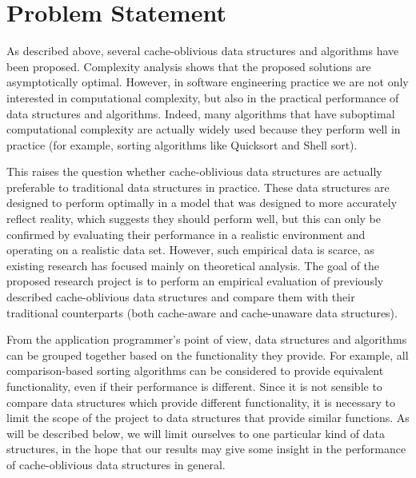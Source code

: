 \documentclass{acm_proc_article-sp}
\begin{document}
\section{Problem Statement}
As described above, several cache-oblivious data structures and algorithms have been proposed. Complexity analysis shows that the proposed solutions are asymptotically optimal. However, in software engineering practice we are not only interested in computational complexity, but also in the practical performance of data structures and algorithms. Indeed, many algorithms that have suboptimal computational complexity are actually widely used because they perform well in practice (for example, sorting algorithms like Quicksort and Shell sort).

This raises the question whether cache-oblivious data structures are actually preferable to traditional data structures in practice. These data structures are designed to perform optimally in a model that was designed to more accurately reflect reality, which suggests they should perform well, but this can only be confirmed by evaluating their performance in a realistic environment and operating on a realistic data set. However, such empirical data is scarce, as existing research has focused mainly on theoretical analysis. The goal of the proposed research project is to perform an empirical evaluation of previously described cache-oblivious data structures and compare them with their traditional counterparts (both cache-aware and cache-unaware data structures).

From the application programmer's point of view, data structures and algorithms can be grouped together based on the functionality they provide. For example, all comparison-based sorting algorithms can be considered to provide equivalent functionality, even if their performance is different. Since it is not sensible to compare data structures which provide different functionality, it is necessary to limit the scope of the project to data structures that provide similar functions. As will be described below, we will limit ourselves to one particular kind of data structures, in the hope that our results may give some insight in the performance of cache-oblivious data structures in general.
\end{document}
